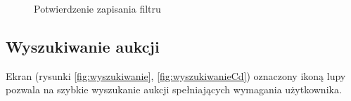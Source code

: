 \documentclass[a4paper,twoside,titlepage,openright]{book}
\begin{document}
\begin{figure}[h]
\begin{minipage}[t]{0.3\textwidth}
		\caption{Potwierdzenie zapisania filtru}
		\label{fig:dodawanieFiltrowPotwierdzenie}
	\end{minipage}
\end{figure}




\subsection{Wyszukiwanie aukcji}
Ekran (rysunki \ref{fig:wyszukiwanie}, \ref{fig:wyszukiwanieCd}) oznaczony ikoną lupy pozwala na szybkie wyszukanie aukcji spełniających wymagania użytkownika.
\end{document}
